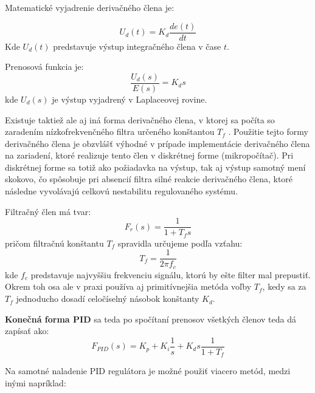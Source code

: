 Matematické vyjadrenie derivačného člena je:

\begin{equation}
U_d (t) = K_d\dfrac{ de(t) }{ dt }
\end{equation}
Kde $U_d(t)$ predstavuje výstup integračného člena v čase $t$.
 
Prenosová funkcia je:
\begin{equation}
\dfrac{U_d( s )}{ E(s) } = K_d s
\end{equation}
kde $U_d(s)$ je výstup vyjadrený v Laplaceovej rovine.

Existuje taktiež ale aj iná forma derivačného člena, v ktorej sa počíta so zaradením nízkofrekvenčného filtra určeného konštantou $T_f$ . Použitie tejto formy derivačného člena je obzvlášť výhodné v prípade implementácie derivačného člena na zariadení, ktoré realizuje tento člen v diskrétnej forme (mikropočítač). Pri diskrétnej forme sa totiž ako požiadavka na výstup, tak aj výstup samotný mení skokovo, čo spôsobuje pri absencií filtra silné reakcie derivačného člena, ktoré následne vyvolávajú celkovú nestabilitu  regulovaného systému.  

Filtračný člen má tvar:
\begin{equation}
F_r ( s ) = \dfrac { 1 }{ 1 + T_f s }
\end{equation}
pričom filtračnú konštantu $T_f$  spravidla určujeme podľa vzťahu:
\begin{equation}
T_f =  \dfrac {1} { 2 \pi f_c }
\label{eq:TFconst}
\end{equation}
kde $f_c$ predstavuje najvyššiu frekvenciu signálu, ktorú by ešte filter mal prepustiť. Okrem toh osa ale v praxi používa aj primitívnejšia metóda voľby $T_f$, kedy sa za $T_f$ jednoducho dosadí  celočíselný násobok konštanty $K_d$.

\textbf{Konečná forma PID} sa teda po spočítaní prenosov všetkých členov teda dá zapísať ako:
\begin{equation}
F_{PID} (s) = K_p + K_i \dfrac{1}{s} + K_d s \dfrac{ 1 } { 1 + T_f }
\label{eq:compPID}
\end{equation}

Na samotné naladenie \ac{PID} regulátora je možné použiť viacero metód, medzi inými napríklad:

